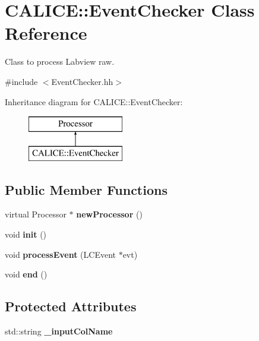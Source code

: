 \section{C\-A\-L\-I\-C\-E\-:\-:Event\-Checker Class Reference}
\label{classCALICE_1_1EventChecker}


Class to process Labview raw.  




{\ttfamily \#include $<$Event\-Checker.\-hh$>$}

Inheritance diagram for C\-A\-L\-I\-C\-E\-:\-:Event\-Checker\-:\begin{figure}[H]
\begin{center}
\leavevmode
\includegraphics[height=2.000000cm]{classCALICE_1_1EventChecker}
\end{center}
\end{figure}
\subsection*{Public Member Functions}
\begin{DoxyCompactItemize}
\item 
virtual Processor $\ast$ {\bfseries new\-Processor} ()\label{classCALICE_1_1EventChecker_af20da755dd41779a95fc39934a69610d}

\item 
void {\bfseries init} ()\label{classCALICE_1_1EventChecker_ab41fa998c1d7ba6fe042e431578cb8e9}

\item 
void {\bfseries process\-Event} (L\-C\-Event $\ast$evt)\label{classCALICE_1_1EventChecker_a6419a5663a9eb46524bd9b8401d812e4}

\item 
void {\bfseries end} ()\label{classCALICE_1_1EventChecker_a34dd62a9bdd384b2a5bb9fc59b3634d5}

\end{DoxyCompactItemize}
\subsection*{Protected Attributes}
\begin{DoxyCompactItemize}
\item 
std\-::string {\bfseries \-\_\-input\-Col\-Name}\label{classCALICE_1_1EventChecker_a94fd86833f389b2eaf23cce14baef4bb}

\end{DoxyCompactItemize}


